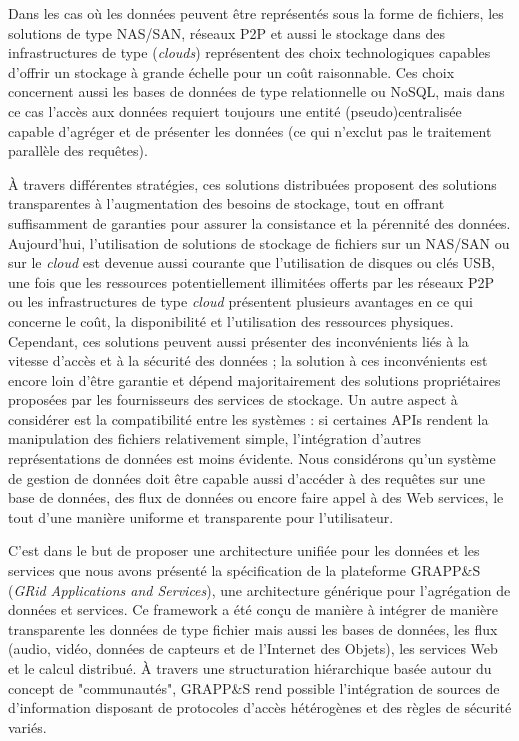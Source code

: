 Dans les cas où les données peuvent être représentés sous la forme de fichiers, les solutions de type NAS/SAN, réseaux P2P et aussi le stockage dans des infrastructures de type (\textit{clouds}) représentent des choix technologiques capables d'offrir un stockage à grande échelle pour un coût raisonnable. Ces choix concernent aussi les bases de données de type relationnelle ou NoSQL, mais dans ce cas l'accès aux données requiert toujours une entité (pseudo)centralisée capable d'agréger et de présenter les données (ce qui n'exclut pas le traitement parallèle des requêtes). 

À travers différentes stratégies, ces solutions distribuées proposent des solutions transparentes à l'augmentation des besoins de stockage, tout en offrant suffisamment de garanties pour assurer la consistance et la pérennité des données. Aujourd'hui, l'utilisation de solutions de stockage de fichiers sur un NAS/SAN ou sur le \textit{cloud} est devenue aussi courante que l'utilisation de disques ou clés USB, une fois que les ressources potentiellement illimitées offerts par les réseaux P2P ou les infrastructures de type \textit{cloud} présentent plusieurs avantages en ce qui concerne le coût, la disponibilité et l'utilisation des ressources physiques. Cependant, ces solutions peuvent aussi présenter des inconvénients liés à la vitesse d'accès et à la sécurité des données ; la solution à ces inconvénients est encore loin d'être garantie et dépend majoritairement des solutions propriétaires proposées par les fournisseurs des services de stockage. Un autre aspect à considérer est la compatibilité entre les systèmes : si certaines APIs rendent la manipulation des fichiers relativement simple, l'intégration d'autres représentations de données est moins évidente. Nous considérons qu'un système de gestion de données doit être capable aussi d'accéder à des requêtes sur une base de données, des flux de données ou encore faire appel à des Web services, le tout d'une manière uniforme et transparente pour l'utilisateur.

C'est dans le but de proposer une architecture unifiée pour les données et les services que nous avons présenté la spécification de la plateforme GRAPP\&S (\textit{GRid Applications and Services}), une architecture générique pour l'agrégation de données et services. Ce framework a été conçu de manière à intégrer de manière transparente les données de type fichier mais aussi les bases de données, les flux (audio, vidéo, données de capteurs et de l'Internet des Objets), les services Web et le calcul distribué. À travers une structuration hiérarchique basée autour du concept de "communautés", GRAPP\&S rend possible l'intégration de sources de d'information disposant de protocoles d'accès hétérogènes et des règles de sécurité variés.

